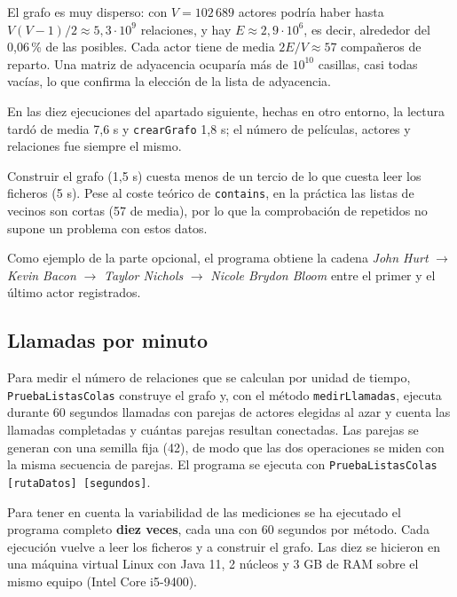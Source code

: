 \documentclass[a4paper,11pt]{report}
\begin{document}
El grafo es muy disperso: con $V = 102\,689$ actores podría haber hasta $V(V-1)/2 \approx 5{,}3 \cdot 10^{9}$ relaciones, y hay $E \approx 2{,}9 \cdot 10^{6}$, es decir, alrededor del 0{,}06\,\% de las posibles. Cada actor tiene de media $2E/V \approx 57$ compañeros de reparto. Una matriz de adyacencia ocuparía más de $10^{10}$ casillas, casi todas vacías, lo que confirma la elección de la lista de adyacencia.

En las diez ejecuciones del apartado siguiente, hechas en otro entorno, la lectura tardó de media 7{,}6 s y \texttt{crearGrafo} 1{,}8 s; el número de películas, actores y relaciones fue siempre el mismo.

Construir el grafo (1{,}5 s) cuesta menos de un tercio de lo que cuesta leer los ficheros (5 s). Pese al coste teórico de \texttt{contains}, en la práctica las listas de vecinos son cortas (57 de media), por lo que la comprobación de repetidos no supone un problema con estos datos.

Como ejemplo de la parte opcional, el programa obtiene la cadena \textit{John Hurt} $\to$ \textit{Kevin Bacon} $\to$ \textit{Taylor Nichols} $\to$ \textit{Nicole Brydon Bloom} entre el primer y el último actor registrados.

\subsection{Llamadas por minuto}

Para medir el número de relaciones que se calculan por unidad de tiempo, \texttt{Prueba\allowbreak Listas\allowbreak Colas} construye el grafo y, con el método \texttt{medirLlamadas}, ejecuta durante 60 segundos llamadas con parejas de actores elegidas al azar y cuenta las llamadas completadas y cuántas parejas resultan conectadas. Las parejas se generan con una semilla fija (42), de modo que las dos operaciones se miden con la misma secuencia de parejas. El programa se ejecuta con \texttt{Prueba\allowbreak Listas\allowbreak Colas [rutaDatos] [segundos]}.

Para tener en cuenta la variabilidad de las mediciones se ha ejecutado el programa completo \textbf{diez veces}, cada una con 60 segundos por método. Cada ejecución vuelve a leer los ficheros y a construir el grafo. Las diez se hicieron en una máquina virtual Linux con Java 11, 2 núcleos y 3 GB de RAM sobre el mismo equipo (Intel Core i5-9400).
\end{document}
